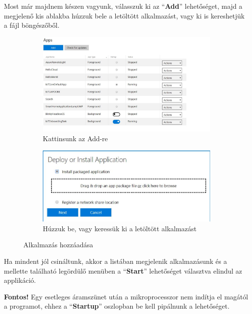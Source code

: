 \documentclass[a4paper,12pt]{report}
\begin{document}
    Most már majdnem készen vagyunk, válasszuk ki az ``\textbf{Add}'' lehetőséget, majd a megjelenő kis ablakba húzzuk bele
    a letöltött alkalmazást, vagy ki is kereshetjük a fájl böngészőből.

    \begin{figure}[H]
        \centering
        \begin{subfigure}[b]{0.4\linewidth}
            \includegraphics[width=\linewidth]{images/addapps.jpg}
            \caption{Kattinsunk az Add-re}
        \end{subfigure}
        \begin{subfigure}[b]{0.4\linewidth}
            \includegraphics[width=\linewidth]{images/deploy.jpg}
            \caption{Húzzuk be, vagy keressük ki a letöltött alkalmazást}
        \end{subfigure}
        \caption{Alkalmazás hozzáadása}
        \label{fig:AddApps}
    \end{figure}

    Ha mindent jól csináltunk, akkor a listában megjelenik alkalmazásunk és a mellette található legördülő menüben a ``\textbf{Start}''
    lehetőséget választva elindul az applikáció.

    \textbf{Fontos!} Egy esetleges áramszünet után a mikroprocesszor nem indítja el magától a programot, ehhez a ``\textbf{Startup}'' oszlopban
    be kell pipálnunk a lehetőséget.
\end{document}
